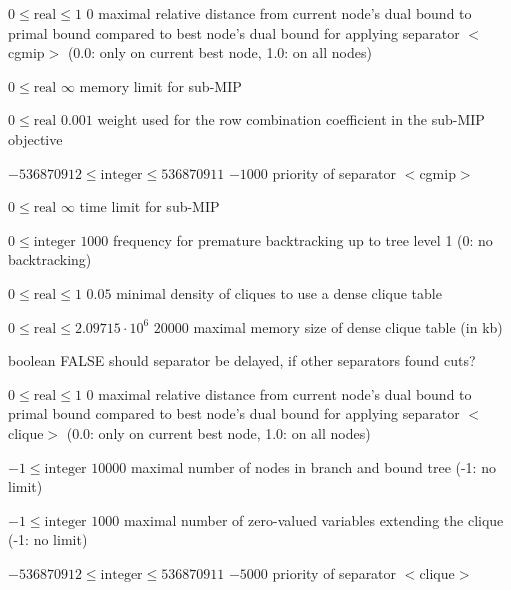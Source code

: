 %
{$0\leq\textrm{real}\leq1$}%
{$0$}%
{maximal relative distance from current node's dual bound to primal bound compared to best node's dual bound for applying separator $<$cgmip$>$ (0.0: only on current best node, 1.0: on all nodes)}%
{}

%
{$0\leq\textrm{real}$}%
{$\infty$}%
{memory limit for sub-MIP}%
{}

%
{$0\leq\textrm{real}$}%
{$0.001$}%
{weight used for the row combination coefficient in the sub-MIP objective}%
{}

%
{$-536870912\leq\textrm{integer}\leq536870911$}%
{$-1000$}%
{priority of separator $<$cgmip$>$}%
{}

%
{$0\leq\textrm{real}$}%
{$\infty$}%
{time limit for sub-MIP}%
{}

%
{$0\leq\textrm{integer}$}%
{$1000$}%
{frequency for premature backtracking up to tree level 1 (0: no backtracking)}%
{}

%
{$0\leq\textrm{real}\leq1$}%
{$0.05$}%
{minimal density of cliques to use a dense clique table}%
{}

%
{$0\leq\textrm{real}\leq2.09715 \cdot 10^{  6}$}%
{$20000$}%
{maximal memory size of dense clique table (in kb)}%
{}

%
{boolean}%
{FALSE}%
{should separator be delayed, if other separators found cuts?}%
{}

%
{$0\leq\textrm{real}\leq1$}%
{$0$}%
{maximal relative distance from current node's dual bound to primal bound compared to best node's dual bound for applying separator $<$clique$>$ (0.0: only on current best node, 1.0: on all nodes)}%
{}

%
{$-1\leq\textrm{integer}$}%
{$10000$}%
{maximal number of nodes in branch and bound tree (-1: no limit)}%
{}

%
{$-1\leq\textrm{integer}$}%
{$1000$}%
{maximal number of zero-valued variables extending the clique (-1: no limit)}%
{}

%
{$-536870912\leq\textrm{integer}\leq536870911$}%
{$-5000$}%
{priority of separator $<$clique$>$}%
{}

